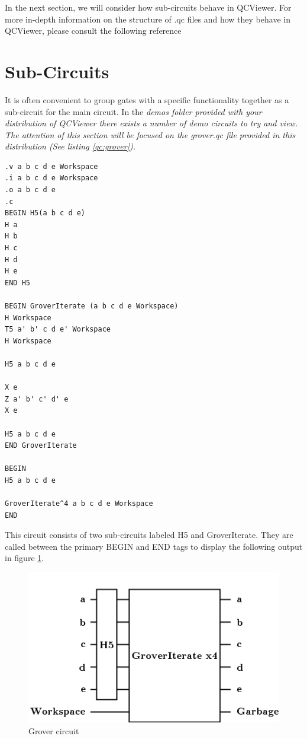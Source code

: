 \documentclass[10pt]{article}
\theoremstyle{definition}
\begin{document}
In the next section, we will consider how sub-circuits behave in QCViewer. For more in-depth information on the structure of .qc files and how they behave in QCViewer, please consult the following reference~\cite{Parent2011Quantum}

\section{Sub-Circuits}\label{sec:SubCircuits}

It is often convenient to group gates with a specific functionality together as a sub-circuit for the main circuit. In the \em demos \em folder provided with your distribution of QCViewer there exists a number of demo circuits to try and view. The attention of this section will be focused on the \em grover.qc \em file provided in this distribution (See listing \ref{qc:grover}).

\begin{program}
\caption{ .qc file for the grover circuit}
\label{qc:grover}
\begin{verbatim}
.v a b c d e Workspace
.i a b c d e Workspace
.o a b c d e
.c
BEGIN H5(a b c d e)
H a
H b
H c
H d
H e
END H5

BEGIN GroverIterate (a b c d e Workspace)
H Workspace
T5 a' b' c d e' Workspace
H Workspace

H5 a b c d e

X e
Z a' b' c' d' e
X e

H5 a b c d e
END GroverIterate

BEGIN
H5 a b c d e

GroverIterate^4 a b c d e Workspace 
END

\end{verbatim}
\end{program}

This circuit consists of two sub-circuits labeled H5 and GroverIterate. They are called between the primary BEGIN and END tags to display the following output in figure \ref{f:grover}.

\begin{figure}
\capstart
\centering
\includegraphics[scale=.5]{Figures/SubCircuits/GroverCircuit}
\caption{Grover circuit}
\label{f:grover}
\end{figure}
\end{document}

